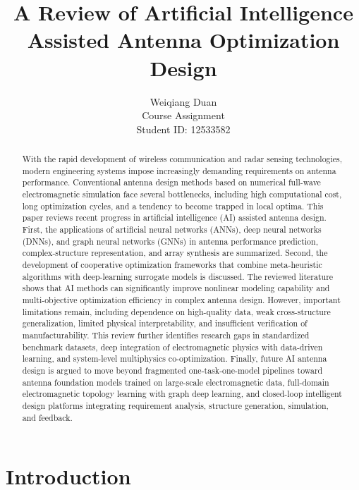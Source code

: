 \documentclass{article}
\title{A Review of Artificial Intelligence Assisted Antenna Optimization Design}
\author{
  Weiqiang Duan \\
  Course Assignment \\
  Student ID: 12533582
}
\begin{document}
\maketitle

\begin{abstract}
With the rapid development of wireless communication and radar sensing technologies, modern engineering systems impose increasingly demanding requirements on antenna performance. Conventional antenna design methods based on numerical full-wave electromagnetic simulation face several bottlenecks, including high computational cost, long optimization cycles, and a tendency to become trapped in local optima. This paper reviews recent progress in artificial intelligence (AI) assisted antenna design. First, the applications of artificial neural networks (ANNs), deep neural networks (DNNs), and graph neural networks (GNNs) in antenna performance prediction, complex-structure representation, and array synthesis are summarized. Second, the development of cooperative optimization frameworks that combine meta-heuristic algorithms with deep-learning surrogate models is discussed. The reviewed literature shows that AI methods can significantly improve nonlinear modeling capability and multi-objective optimization efficiency in complex antenna design. However, important limitations remain, including dependence on high-quality data, weak cross-structure generalization, limited physical interpretability, and insufficient verification of manufacturability. This review further identifies research gaps in standardized benchmark datasets, deep integration of electromagnetic physics with data-driven learning, and system-level multiphysics co-optimization. Finally, future AI antenna design is argued to move beyond fragmented one-task-one-model pipelines toward antenna foundation models trained on large-scale electromagnetic data, full-domain electromagnetic topology learning with graph deep learning, and closed-loop intelligent design platforms integrating requirement analysis, structure generation, simulation, and feedback.
\end{abstract}


\section{Introduction}
\end{document}
